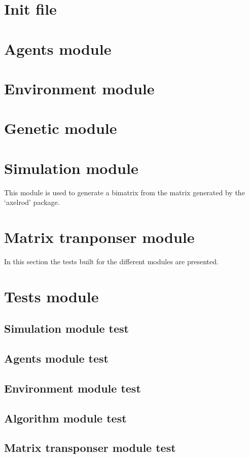 \label{app:codemodules}
\section{Init file}

\section{Agents module}

\newpage
\section{Environment module}

\newpage
\section{Genetic module}

\newpage
\section{Simulation module}

\newpage
This module is used to generate a bimatrix from the matrix generated by the `axelrod' package.
\section{Matrix tranponser module}

\newpage
In this section the tests built for the different modules are presented.
\section{Tests module}
\subsection{Simulation module test}
\subsection{Agents module test}
\subsection{Environment module test}
\subsection{Algorithm module test}
\subsection{Matrix transponser module test}
